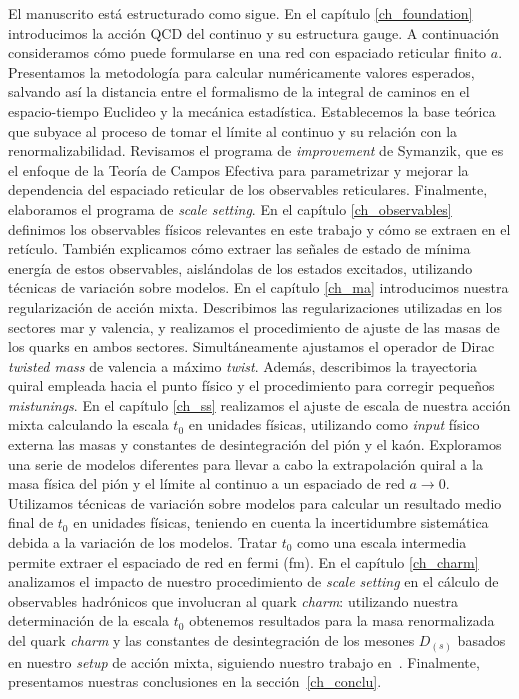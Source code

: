 El manuscrito está estructurado como sigue. En el capítulo \ref{ch_foundation} introducimos la acción QCD del continuo y su estructura gauge. A continuación consideramos cómo puede formularse en una red con espaciado reticular finito $a$. Presentamos la metodología para calcular numéricamente valores esperados, salvando así la distancia entre el formalismo de la integral de caminos en el espacio-tiempo Euclideo y la mecánica estadística. Establecemos la base teórica que subyace al proceso de tomar el límite al continuo y su relación con la renormalizabilidad. Revisamos el programa de \textit{improvement} de Symanzik, que es el enfoque de la Teoría de Campos Efectiva para parametrizar y mejorar la dependencia del espaciado reticular de los observables reticulares. Finalmente, elaboramos el programa de \textit{scale setting}. En el capítulo \ref{ch_observables} definimos los observables físicos relevantes en este trabajo y cómo se extraen en el retículo. También explicamos cómo extraer las señales de estado de mínima energía de estos observables, aislándolas de los estados excitados, utilizando técnicas de variación sobre modelos. En el capítulo \ref{ch_ma} introducimos nuestra regularización de acción mixta. Describimos las regularizaciones utilizadas en los sectores mar y valencia, y realizamos el procedimiento de ajuste de las masas de los quarks en ambos sectores. Simultáneamente ajustamos el operador de Dirac \textit{twisted mass} de valencia a máximo \textit{twist}. Además, describimos la trayectoria quiral empleada hacia el punto físico y el procedimiento para corregir pequeños \textit{mistunings}. En el capítulo \ref{ch_ss} realizamos el ajuste de escala de nuestra acción mixta calculando la escala $t_0$ en unidades físicas, utilizando como \textit{input} físico externa las masas y constantes de desintegración del pión y el kaón. Exploramos una serie de modelos diferentes para llevar a cabo la extrapolación quiral a la masa física del pión y el límite al continuo a un espaciado de red $a\to0$. Utilizamos técnicas de variación sobre modelos para calcular un resultado medio final de $t_0$ en unidades físicas, teniendo en cuenta la incertidumbre sistemática debida a la variación de los modelos. Tratar $t_0$ como una escala intermedia permite extraer el espaciado de red en fermi (fm). En el capítulo \ref{ch_charm} analizamos el impacto de nuestro procedimiento de \textit{scale setting} en el cálculo de observables hadrónicos que involucran al quark \textit{charm}: utilizando nuestra determinación de la escala $t_0$ obtenemos resultados para la masa renormalizada del quark \textit{charm} y las constantes de desintegración de los mesones $D_{(s)}$ basados en nuestro \textit{setup} de acción mixta, siguiendo nuestro trabajo en~\citep{charm}. Finalmente, presentamos nuestras conclusiones en la sección~\ref{ch_conclu}.

